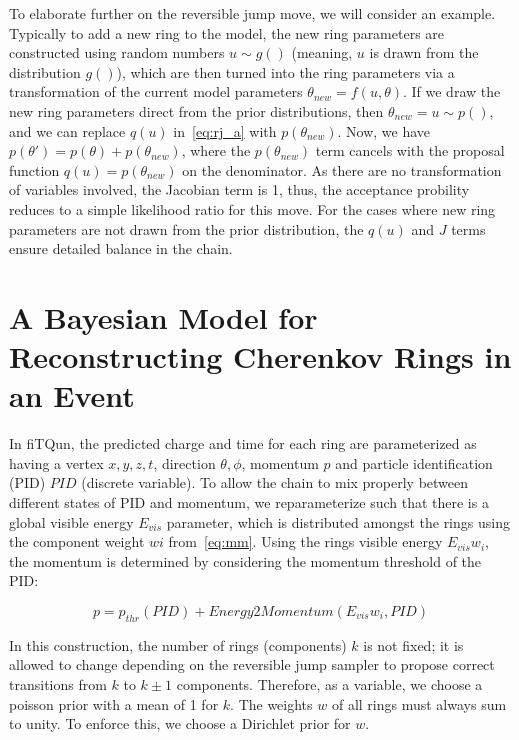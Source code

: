 \documentclass[11pt]{article} %
\begin{document}
To elaborate further on the reversible jump move, we will consider an example. Typically to add a new ring to the model, the new ring parameters are constructed using random numbers $u\sim g()$ (meaning, $u$ is drawn from the distribution $g()$), which are then turned into the ring parameters via a transformation of the current model parameters $\theta_{new} = f(u,\theta)$. If we draw the new ring parameters direct from the prior distributions, then $\theta_{new} = u\sim p()$, and we can replace $q(u)$ in~\ref{eq:rj_a} with $p(\theta_{new})$. Now, we have $p(\theta')=p(\theta)+p(\theta_{new})$, where the $p(\theta_{new})$ term cancels with the proposal function $q(u) = p(\theta_{new})$ on the denominator. As there are no transformation of variables involved, the Jacobian term is 1, thus, the acceptance probility reduces to a simple likelihood ratio for this move. For the cases where new ring parameters are not drawn from the prior distribution, the $q(u)$ and $J$ terms ensure detailed balance in the chain.

\section{A Bayesian Model for Reconstructing Cherenkov Rings in an Event}
In fiTQun, the predicted charge and time for each ring are parameterized as having a vertex $x,y,z,t$, direction $\theta,\phi$, momentum $p$ and particle identification (PID) $PID$ (discrete variable). To allow the chain to mix properly between different states of PID and momentum, we reparameterize such that there is a global visible energy $E_{vis}$ parameter, which is distributed amongst the rings using the component weight $w{i}$ from~\ref{eq:mm}. Using the rings visible energy $E_{vis}w_{i}$, the momentum is determined by considering the momentum threshold of the PID:

\begin{equation}
p = p_{thr}(PID) + Energy2Momentum(E_{vis}w_{i}, PID)
\end{equation}

In this construction, the number of rings (components) $k$ is not fixed; it is allowed to change depending on the reversible jump sampler to propose correct transitions from $k$ to $k\pm1$ components. Therefore, as a variable, we choose a poisson prior with a mean of 1 for $k$.
The weights $w$ of all rings must always sum to unity. To enforce this, we choose a Dirichlet prior for $w$. 



{}

\end{document}
